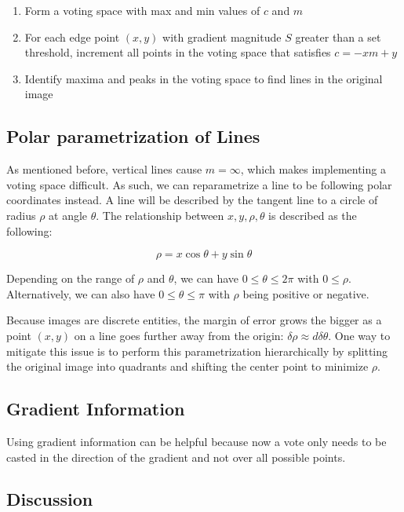 \documentclass{article}
\begin{document}
\begin{multicols}{2}
\begin{enumerate}
  \item Form a voting space with max and min values of $c$ and $m$
  \item For each edge point $(x,y)$ with gradient magnitude $S$ greater than a set threshold, increment all points in the voting space that satisfies $c = -xm + y$
  \item Identify maxima and peaks in the voting space to find lines in the original image
\end{enumerate}

\subsection{Polar parametrization of Lines}

As mentioned before, vertical lines cause $m = \infty$, which makes implementing a voting space difficult. As such, we can reparametrize a line to be following polar coordinates instead. A line will be described by the tangent line to a circle of radius $\rho$ at angle $\theta$. The relationship between $x, y, \rho, \theta$ is described as the following:

$$
\rho = x\cos\theta+y\sin\theta
$$

Depending on the range of $\rho$ and $\theta$, we can have $0 \leq \theta \leq 2\pi$ with $0 \leq \rho$. Alternatively, we can also have $0 \leq \theta \leq \pi$ with $\rho$ being positive or negative.

Because images are discrete entities, the margin of error grows the bigger as a point $(x,y)$ on a line goes further away from the origin: $\delta \rho \approx d \delta \theta$. One way to mitigate this issue is to perform this parametrization hierarchically by splitting the original image into quadrants and shifting the center point to minimize $\rho$.

\subsection{Gradient Information}

Using gradient information can be helpful because now a vote only needs to be casted in the direction of the gradient and not over all possible points.

\subsection{Discussion}


\end{multicols}
\end{document}
